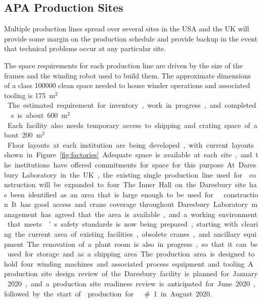 \subsection{APA Production Sites}
\label{sec:fdsp-apa-prod-facility}

Multiple  production lines spread over several sites in the USA and the UK will provide some margin on the production schedule and provide backup in the event that technical problems occur at any particular site. 

The space requirements for each production line are driven by the size of the  frames and the winding robot used to build them. The approximate dimensions of a class \num{100000} clean space needed to house winder operations and associated tooling is \SI{175}{m$^2$}. The estimated requirement for inventory, work in progress, and completed s is about \SI{600}{m$^2$}. Each facility  also needs temporary access to shipping and crating space of about \SI{200}{m$^2$}. Floor layouts at each institution are being developed, with current layouts shown in Figure~\ref{fig:factories}. Adequate space is available at each site, and the institutions have offered commitments for space for this purpose. %

At Daresbury Laboratory in the UK, the existing single production line used for  construction will be expanded to four.  The Inner Hall on the Daresbury site has been identified as an area that is large enough to be used for   construction. It has good access and crane coverage throughout. Daresbury Laboratory management has agreed that the area is available, and a working environment that meets 's safety standards is now being prepared, starting with clearing the current area of existing facilities, obsolete cranes, and ancillary equipment. The renovation of a plant room is also in progress, so that it can be used for storage and as a shipping area. The production area is designed to hold four winding machines and associated process equipment and tooling.  A production site design review of the Daresbury facility is planned for January 2020, and a production site readiness review is anticipated for June 2020, followed by the start of  production for   \#1 in August 2020.  


